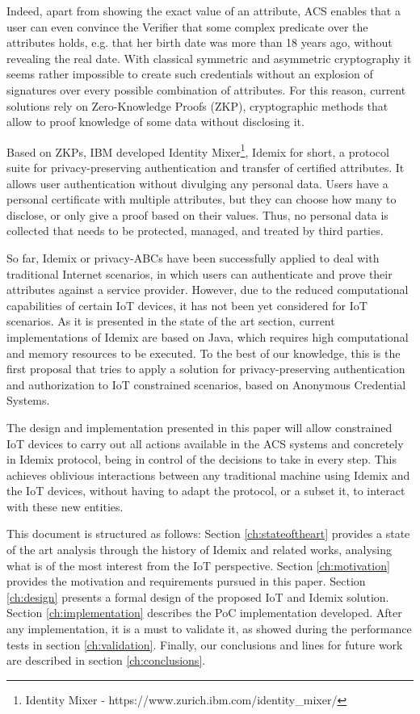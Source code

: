 Indeed, apart from showing the exact value of an attribute, ACS enables that a user can even convince the Verifier that some complex predicate over the attributes holds, e.g. that her birth date was more than 18 years ago, without revealing the real date. With classical symmetric and asymmetric cryptography it seems rather impossible to create such credentials without an explosion of signatures over every possible combination of attributes. For this reason, current solutions rely on  Zero-Knowledge Proofs (ZKP), cryptographic methods that allow to proof knowledge of some data without disclosing it.

Based on ZKPs, IBM developed Identity Mixer\footnote{Identity Mixer - {https://www.zurich.ibm.com/identity\_mixer/}}, %
Idemix for short, a protocol suite for privacy-preserving authentication and transfer of certified attributes. It allows user authentication without divulging any personal data. Users have a personal certificate with multiple attributes, but they can choose how many to disclose, or only give a proof based on their values. Thus, no personal data is collected that needs to be protected, managed, and treated by third parties.

So far, Idemix or privacy-ABCs have been successfully applied to deal with traditional Internet scenarios, in which users can authenticate and prove their attributes against a service provider. However, due to the reduced computational capabilities of certain IoT devices, it has not been yet considered for IoT scenarios. As it is presented in the state of the art section, current implementations of Idemix are based on Java, which requires high computational and memory resources to be executed. To the best of our knowledge, this is the first proposal that tries to apply a solution for privacy-preserving authentication and authorization to IoT constrained scenarios, based on Anonymous Credential Systems.

The design and implementation presented in this paper will allow constrained IoT devices to carry out all actions available in the ACS systems and concretely in Idemix protocol, being in control of the decisions to take in every step. This achieves oblivious interactions between any traditional machine using Idemix and the IoT devices, without having to adapt the protocol, or a subset it, to interact with these new entities.

\hfil

This document is structured as follows: Section \ref{ch:stateoftheart} provides a state of the art analysis through the history of Idemix and related works, analysing what is of the most interest from the IoT perspective. Section \ref{ch:motivation} provides the motivation and requirements pursued in this paper. Section \ref{ch:design} presents a formal design of the proposed IoT and Idemix solution. Section \ref{ch:implementation} describes the PoC implementation developed. After any implementation, it is a must to validate it, as showed during the performance tests in section \ref{ch:validation}. Finally, our conclusions and lines for future work are described in section \ref{ch:conclusions}.
